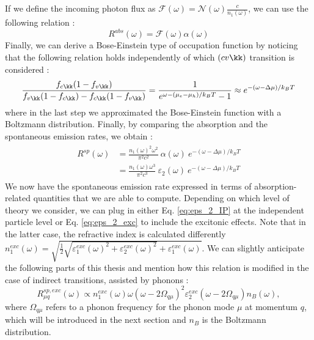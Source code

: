 If we define the incoming photon flux as $\mathcal{F}(\omega) = \mathcal{N}(\omega) \frac{c}{n_1(\omega)}$, we can use the following relation :
\begin{equation}
	R^{abs}(\omega) = \mathcal{F}(\omega) \alpha(\omega)
\end{equation}
Finally, we can derive a Bose-Einstein type of occupation function by noticing that the following relation holds independently of which $(cv\kk)$ transition is considered :
\begin{equation}
	\frac{f_{c\kk} (1-f_{v\kk})}{f_{v\kk} (1-f_{c\kk}) - f_{c\kk}(1-f_{v\kk})} = \frac{1}{e^{\omega - (\mu_e - \mu_h)/k_BT} - 1 }\approx e^{-(\omega - \Delta \mu)/k_BT}
\end{equation}
where in the last step we approximated the Bose-Einstein function with a Boltzmann distribution.
Finally, by comparing the absorption and the spontaneous emission rates, we obtain :
\begin{align}
\begin{split}
	R^{sp}(\omega) &= \frac{n_1(\omega)^2\omega^2}{\pi^2 c^2}\ \alpha(\omega)\ e^{-(\omega - \Delta \mu)/k_BT} \\
	 &= \frac{n_1(\omega)\omega^3}{\pi^2 c^3}\ \varepsilon_2(\omega)\ e^{-(\omega - \Delta \mu)/k_BT} \label{eq:vRS_PL}
\end{split}
\end{align}
We now have the spontaneous emission rate expressed in terms of absorption-related quantities that we are able to compute. Depending on which level of theory we consider, we can plug in either Eq. \eqref{eq:eps_2_IP} at the independent particle level or Eq. \eqref{eq:eps_2_exc} to include the excitonic effects. Note that in the latter case, the refractive index is calculated differently $n_1^{exc}(\omega) = \sqrt{\tfrac{1}{2}\sqrt{\varepsilon_1^{exc}(\omega)^2+\varepsilon^{exc}_2(\omega)^2} + \varepsilon^{exc}_1(\omega)}$. We can slightly anticipate the following parts of this thesis and mention how this relation is modified in the case of indirect transitions, assisted by phonons :
\begin{equation}
	R^{sp,exc}_{\mu q}(\omega) \propto n_1^{exc}(\omega) \omega(\omega - 2 \Omega_{q\mu})^2 \varepsilon^{exc}_2(\omega - 2\Omega_{q\mu})n_{B}(\omega), \label{eq:vRS_PL_ind}
\end{equation}
where $\Omega_{q\mu}$ refers to a phonon frequency for the phonon mode $\mu$ at momentum $q$, which will be introduced in the next section and $n_B$ is the Boltzmann distribution.

